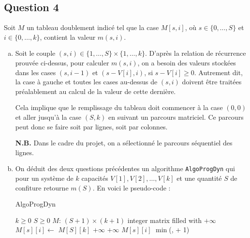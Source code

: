 \documentclass[12pt,a4paper]{article}
\begin{document}
\subsection*{Question 4}
Soit $M$ un tableau doublement indic\'e tel que la case $M[s,i]$, o\`u $s \in \{0,\dotsc,S\}$ et $i \in \{0,\dotsc,k\}$, contient la valeur $m(s,i)$.

\begin{enumerate}[a)]
 \item Soit le couple $(s,i) \in \{1,\dotsc,S\} \times \{1,\dotsc,k\}$. D'apr\`es la relation de r\'ecurrence prouv\'ee ci-dessus, pour calculer $m(s,i)$, on a besoin des valeurs stock\'ees dans les cases $(s,i-1)$ et $(s-V[i],i)$, si $s-V[i] \geq 0$. Autrement dit, la case \`a gauche et toutes les cases au-dessus de $(s,i)$ doivent \^etre trait\'ees pr\'ealablement au calcul de la valeur de cette derni\`ere.
 
 Cela implique que le remplissage du tableau doit commencer \`a la case $(0,0)$ et aller jusqu'\`a la case $(S,k)$ en suivant un parcours matriciel. Ce parcours peut donc se faire soit par lignes, soit par colonnes. 
 
 {\bfseries N.B.} Dans le cadre du projet, on a s\'electionn\'e le parcours s\'equentiel des lignes.
 
 \item On d\'eduit des deux questions pr\'ec\'edentes un algorithme \texttt{AlgoProgDyn} qui pour un syst\`eme de $k$ capacit\'es $V[1],V[2],\dotsc,V[k]$ et une quantit\'e $S$ de confiture retourne $m(S)$. En voici le pseudo-code :
 
\begin{algorithm}
\caption{AlgoProgDyn}
\begin{algorithmic}[1]
\Require $k \geq 0$ \AND $S \geq 0$
    \State $M$: $(S+1) \times (k+1)$ integer matrix filled with $+\infty$
            \State $M[s][i] \gets $ 
        \EndFor
    \EndFor
    \State \Return $M[S][k]$
\EndFunction
\Statex
{}
        \State {}
        \State \Return $+\infty$
        \State \Return $+\infty$
    	\State \Return $M[s][i]$
    \Else 
        \State \Return $\min$(,  + 1)
    \EndIf
\EndFunction
\end{algorithmic}
\end{algorithm}


\end{enumerate}
\end{document}
